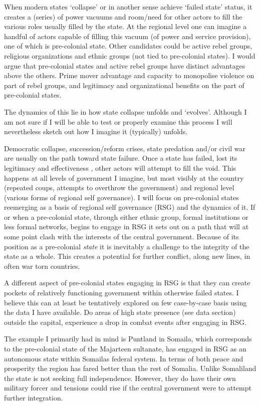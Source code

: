 \documentclass[12pt]{article}
\begin{document}
When modern states `collapse' or in another sense achieve `failed state' status,
it creates a (series) of power vacuums and room/need for other actors to fill
the various roles usually filled by the state. At the regional level one can
imagine a handful of actors capable of filling this vacuum (of power and
service provision), one of which is pre-colonial state. Other candidates could
be active rebel groups, religious organizations and ethnic groups (not tied to
pre-colonial states). I would argue that pre-colonial states and active rebel
groups have distinct advantages above the others. Prime mover advantage and
capacity to monopolise violence on part of rebel groups, and legitimacy and
organizational benefits on the part of pre-colonial states.

The dynamics of this lie in how state collapse unfolds and `evolves'. Although I
am not sure if I will be able to test or properly examine this process I will
nevertheless sketch out how I imagine it (typically) unfolds.

Democratic collapse, succession/reform crises, state predation and/or civil war
are usually on the path toward state failure\citep{Goldstone_2008}. Once a state
has failed, lost its legitimacy and effectiveness \citep{Goldstone_2008}, other
actors will attempt to fill the void. This happens at all levels of government I
imagine, but most visibly at the country (repeated coups, attempts to overthrow
the government) and regional level (various forms of regional self governance).
I will focus on pre-colonial states reemerging as a basis of regional self
governance  (RSG) and the dynamics of it. If or when a pre-colonial state,
through either ethnic group, formal institutions or less formal networks, begins
to engage in RSG it sets out on a path that will at some point clash with the
interests of the central government. Because of its position as a pre-colonial
\textit{state} it is inevitably a challenge to the integrity of the state as a
whole. This creates a potential for further conflict, along new lines, in often
war torn countries. 

A different aspect of pre-colonial states engaging in RSG is that they can
create pockets of relatively functioning government within otherwise failed
states. I believe this can at least be tentatively explored on few case-by-case
basis using the data I have available. Do areas of high state presence (see data
section) outside the capital, experience a drop in combat events after engaging
in RSG. 

The example I primarily had in mind is  Puntland in Somaila, which corresponds
to the pre-colonial state of the Majarteen sultanate, has engaged in RSG as an
autonomous state within Somailas federal system. In terms of both peace and
prosperity the region has fared better than the rest of Somalia. Unlike
Somaliland the state is not seeking full independence. However, they do have
their own military forcer and tensions could rise if the central government were
to attempt further integration.
\end{document}
